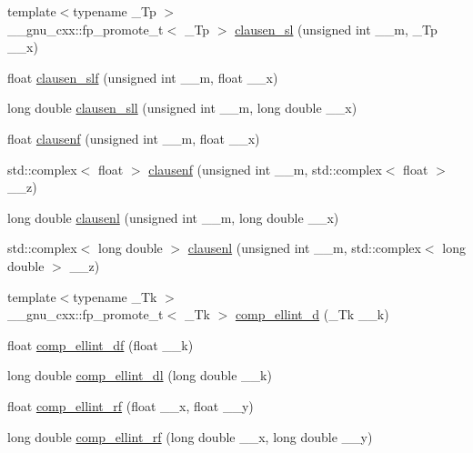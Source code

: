 \begin{DoxyCompactItemize}
\item 
{\footnotesize template$<$typename \+\_\+\+Tp $>$ }\\\+\_\+\+\_\+gnu\+\_\+cxx\+::fp\+\_\+promote\+\_\+t$<$ \+\_\+\+Tp $>$ \hyperlink{group__gnu__math__spec__func_gacb757b00309213cd96bb2bc6b5dc3c24}{clausen\+\_\+sl} (unsigned int \+\_\+\+\_\+m, \+\_\+\+Tp \+\_\+\+\_\+x)
\item 
float \hyperlink{group__gnu__math__spec__func_gadd92821afcbfbdc79496b091b12a357f}{clausen\+\_\+slf} (unsigned int \+\_\+\+\_\+m, float \+\_\+\+\_\+x)
\item 
long double \hyperlink{group__gnu__math__spec__func_ga227d105b4c0659c4402de7217bb9b65b}{clausen\+\_\+sll} (unsigned int \+\_\+\+\_\+m, long double \+\_\+\+\_\+x)
\item 
float \hyperlink{group__gnu__math__spec__func_ga6422bdec1a3c930fb1623094cd2eaff2}{clausenf} (unsigned int \+\_\+\+\_\+m, float \+\_\+\+\_\+x)
\item 
std\+::complex$<$ float $>$ \hyperlink{group__gnu__math__spec__func_ga98b5ba1e5de4ef2e0e9422ac8d9ce2ad}{clausenf} (unsigned int \+\_\+\+\_\+m, std\+::complex$<$ float $>$ \+\_\+\+\_\+z)
\item 
long double \hyperlink{group__gnu__math__spec__func_ga33132bab39c8d78dde807b45fc06de52}{clausenl} (unsigned int \+\_\+\+\_\+m, long double \+\_\+\+\_\+x)
\item 
std\+::complex$<$ long double $>$ \hyperlink{group__gnu__math__spec__func_gae39368808280f5c1b80dce7c2f4a67a7}{clausenl} (unsigned int \+\_\+\+\_\+m, std\+::complex$<$ long double $>$ \+\_\+\+\_\+z)
\item 
{\footnotesize template$<$typename \+\_\+\+Tk $>$ }\\\+\_\+\+\_\+gnu\+\_\+cxx\+::fp\+\_\+promote\+\_\+t$<$ \+\_\+\+Tk $>$ \hyperlink{group__gnu__math__spec__func_ga3fe79a91524b43ffc5ffb83c0eb2bd00}{comp\+\_\+ellint\+\_\+d} (\+\_\+\+Tk \+\_\+\+\_\+k)
\item 
float \hyperlink{group__gnu__math__spec__func_ga34ac6488b0e7531d5d4b7a8e31ff864e}{comp\+\_\+ellint\+\_\+df} (float \+\_\+\+\_\+k)
\item 
long double \hyperlink{group__gnu__math__spec__func_ga494931ec0a271b79f1fdcfdf929e3138}{comp\+\_\+ellint\+\_\+dl} (long double \+\_\+\+\_\+k)
\item 
float \hyperlink{group__gnu__math__spec__func_ga55ae30b4f8ff15017d18a80050e14e38}{comp\+\_\+ellint\+\_\+rf} (float \+\_\+\+\_\+x, float \+\_\+\+\_\+y)
\item 
long double \hyperlink{group__gnu__math__spec__func_gae1d468487f1711e91719a9c6392f3c35}{comp\+\_\+ellint\+\_\+rf} (long double \+\_\+\+\_\+x, long double \+\_\+\+\_\+y)

\end{DoxyCompactItemize}

